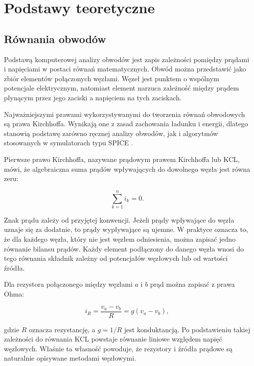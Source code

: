 \chapter{Podstawy teoretyczne}
\label{chap:podstawy-teoretyczne}

\section{Równania obwodów}
\label{sec:rownania-obwodow}

Podstawą komputerowej analizy obwodów jest zapis zależności pomiędzy prądami i napięciami w postaci równań matematycznych. Obwód można przedstawić jako zbiór elementów połączonych węzłami. Węzeł jest punktem o wspólnym potencjale elektrycznym, natomiast element narzuca zależność między prądem płynącym przez jego zaciski a napięciem na tych zaciskach.

Najważniejszymi prawami wykorzystywanymi do tworzenia równań obwodowych są prawa Kirchhoffa. Wynikają one z zasad zachowania ładunku i energii, dlatego stanowią podstawę zarówno ręcznej analizy obwodów, jak i algorytmów stosowanych w symulatorach typu SPICE \cite{chua1975computer,vlach1994computer}.

Pierwsze prawo Kirchhoffa, nazywane prądowym prawem Kirchhoffa lub KCL, mówi, że algebraiczna suma prądów wpływających do dowolnego węzła jest równa zeru:

\begin{equation}
\label{eq:kcl}
\sum_{k=1}^{n} i_k = 0.
\end{equation}

Znak prądu zależy od przyjętej konwencji. Jeżeli prądy wpływające do węzła uznaje się za dodatnie, to prądy wypływające są ujemne. W praktyce oznacza to, że dla każdego węzła, który nie jest węzłem odniesienia, można zapisać jedno równanie bilansu prądów. Każdy element podłączony do danego węzła wnosi do tego równania składnik zależny od potencjałów węzłowych lub od wartości źródła.

Dla rezystora połączonego między węzłami \(a\) i \(b\) prąd można zapisać z prawa Ohma:

\begin{equation}
\label{eq:resistor-current}
i_R = \frac{v_a - v_b}{R} = g(v_a - v_b),
\end{equation}

gdzie \(R\) oznacza rezystancję, a \(g = 1/R\) jest konduktancją. Po podstawieniu takiej zależności do równania KCL powstaje równanie liniowe względem napięć węzłowych. Właśnie ta własność powoduje, że rezystory i źródła prądowe są naturalnie opisywane metodami węzłowymi.

